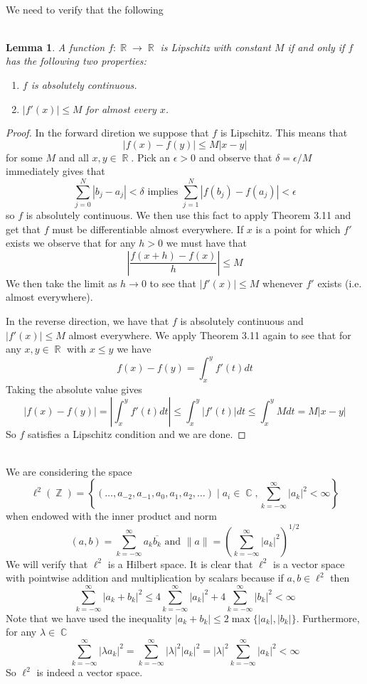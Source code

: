 \documentclass{article}
\DeclareMathOperator{\Z}{\mathbb{Z}}
\DeclareMathOperator{\R}{\mathbb{R}}
\DeclareMathOperator{\C}{\mathbb{C}}
\DeclareMathOperator{\suchthat}{\mathrel{|}}
\newcommand{\problem}[1]{\noindent{\textbf{Problem #1}}\\}
\newcommand{\norm}[1]{\|#1\|}
\newtheorem*{lem}{\\ Lemma}
\begin{document}
\problem{3.5.32}
We need to verify that the following 
\begin{lem}
A function $f: \R \to \R$ is Lipschitz with constant $M$ if and only if $f$ has the following two properties:
\begin{enumerate}
\item[(i)] $f$ is absolutely continuous.
\item[(ii)] $|f'(x)| \leq M$ for almost every $x$.
\end{enumerate} 
\end{lem}
\begin{proof}
In the forward diretion we suppose that $f$ is Lipschitz. This means that
\[
|f(x) - f(y)| \leq M|x - y|
\]
for some $M$ and all $x,y \in \R$. Pick an $\epsilon > 0$ and observe that $\delta = \epsilon/M$ immediately gives that
\[
\sum_{j = 0}^N|b_j - a_j| < \delta \text{ implies } \sum_{j=1}^N |f(b_j) - f(a_j)| < \epsilon
\]
so $f$ is absolutely continuous. We then use this fact to apply Theorem 3.11 and get that $f$ must be differentiable almost everywhere. If $x$ is a point for which $f'$ exists we observe that for any $h > 0$ we must have that
\[
|\frac{f(x+h) - f(x)}{h}| \leq M
\]
We then take the limit as $h \to 0$ to see that $|f'(x)| \leq M$ whenever $f'$ exists (i.e. almost everywhere). 

In the reverse direction, we have that $f$ is absolutely continuous and $|f'(x)| \leq M$ almost everywhere. We apply Theorem 3.11 again to see that for any $x,y \in \R$ with $x \leq y$ we have
\[
f(x) - f(y) = \int_x^y f'(t)dt
\]
Taking the absolute value gives
\[
|f(x) - f(y)| = \left|\int_x^y f'(t)dt\right| \leq \int_x^y |f'(t)|dt \leq \int_x^y Mdt = M|x - y|
\]
So $f$ satisfies a Lipschitz condition and we are done. 
\end{proof}

\pagebreak

\problem{4.6.4} We are considering the space 
\[
\ell^2(\Z) = \left\{(\ldots , a_{-2}, a_{-1}, a_0, a_1, a_2, \ldots ) \suchthat a_i\in \C, \sum_{k=-\infty}^\infty |a_k|^2 < \infty\right\}
\]
when endowed with the inner product and norm
\[
(a,b) = \sum_{k=-\infty}^\infty a_k\overline{b_k} \text{ and } \norm{a} = \left(\sum_{k=-\infty}^\infty|a_k|^2\right)^{1/2}
\]
We will verify that $\ell^2$ is a Hilbert space. It is clear that $\ell^2$ is a vector space with pointwise addition and multiplication by scalars because if $a,b \in \ell^2$ then 
\[
\sum_{k=-\infty}^\infty |a_k + b_k|^2 \leq 4\sum_{k=-\infty}^\infty|a_k|^2 + 4\sum_{k=-\infty}^\infty |b_k|^2 < \infty
\]
Note that we have used the inequality $|a_k + b_k| \leq 2\max\{|a_k|,|b_k|\}$. Furthermore, for any $\lambda \in \C$
\[
\sum_{k=-\infty}^\infty |\lambda a_k|^2 = \sum_{k=-\infty}^\infty |\lambda|^2|a_k|^2 = |\lambda |^2\sum_{k=-\infty}^\infty |a_k|^2 <\infty
\]
So $\ell^2$ is indeed a vector space. 
\end{document}
